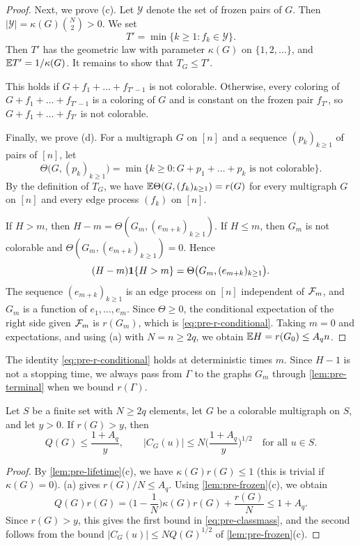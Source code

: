 \begin{proof}
Next, we prove (c). Let $\mathcal Y$ denote the set of frozen pairs of $G$. Then $|\mathcal Y| = \kappa(G)\binom{N}{2} > 0$. We set
\[
T' = \min\{k \ge 1 : f_k \in \mathcal Y\}.
\]
Then $T'$ has the geometric law with parameter $\kappa(G)$ on $\{1, 2, \dots\}$, and $\mathbb E T' = 1/\kappa(G)$. It remains to show that $T_G \le T'$.

This holds if $G + f_1 + \dots + f_{T' - 1}$ is not colorable. Otherwise, every coloring of $G + f_1 + \dots + f_{T' - 1}$ is a coloring of $G$ and is constant on the frozen pair $f_{T'}$, so $G + f_1 + \dots + f_{T'}$ is not colorable.

Finally, we prove (d). For a multigraph $G$ on $[n]$ and a sequence $(p_k)_{k \ge 1}$ of pairs of $[n]$, let
\[
\Theta\big(G, (p_k)_{k \ge 1}\big) = \min\{k \ge 0 : G + p_1 + \dots + p_k \text{ is not colorable}\}.
\]
By the definition of $T_G$, we have $\mathbb E \Theta(G, (f_k)_{k \ge 1}) = r(G)$ for every multigraph $G$ on $[n]$ and every edge process $(f_k)$ on $[n]$.

If $H > m$, then $H - m = \Theta(G_m, (e_{m + k})_{k \ge 1})$. If $H \le m$, then $G_m$ is not colorable and $\Theta(G_m, (e_{m + k})_{k \ge 1}) = 0$. Hence
\[
(H - m) \mathbf 1\{H > m\} = \Theta\big(G_m, (e_{m + k})_{k \ge 1}\big).
\]
The sequence $(e_{m + k})_{k \ge 1}$ is an edge process on $[n]$ independent of $\mathcal F_m$, and $G_m$ is a function of $e_1, \dots, e_m$. Since $\Theta \ge 0$, the conditional expectation of the right side given $\mathcal F_m$ is $r(G_m)$, which is \eqref{eq:pre-r-conditional}. Taking $m = 0$ and expectations, and using (a) with $N = n \ge 2q$, we obtain $\mathbb E H = r(G_0) \le A_q n$.
\end{proof}

The identity \eqref{eq:pre-r-conditional} holds at deterministic times $m$. Since $H - 1$ is not a stopping time, we always pass from $\Gamma$ to the graphs $G_m$ through \cref{lem:pre-terminal} when we bound $r(\Gamma)$.

\begin{lemma}\label{lem:pre-classmass}
Let $S$ be a finite set with $N \ge 2q$ elements, let $G$ be a colorable multigraph on $S$, and let $y > 0$. If $r(G) > y$, then
\begin{equation}\label{eq:pre-classmass}
Q(G) \le \frac{1 + A_q}{y}, \qquad |C_G(u)| \le N \Big(\frac{1 + A_q}{y}\Big)^{1/2} \quad \text{for all } u \in S.
\end{equation}
\end{lemma}

\begin{proof}
By \cref{lem:pre-lifetime}(c), we have $\kappa(G) r(G) \le 1$ (this is trivial if $\kappa(G) = 0$). (a) gives $r(G)/N \le A_q$. Using \cref{lem:pre-frozen}(c), we obtain
\[
Q(G) r(G) = \Big(1 - \frac 1N\Big) \kappa(G) r(G) + \frac{r(G)}{N} \le 1 + A_q.
\]
Since $r(G) > y$, this gives the first bound in \eqref{eq:pre-classmass}, and the second follows from the bound $|C_G(u)| \le N Q(G)^{1/2}$ of \cref{lem:pre-frozen}(c).
\end{proof}


